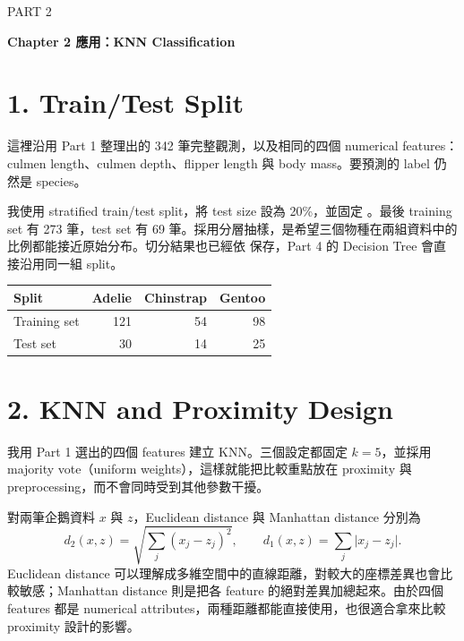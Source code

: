 \clearpage

\begin{center}
  {\color{accent}\large PART 2}\par
  \vspace{0.25em}
  {\Large\bfseries Chapter 2 應用：KNN Classification}\par
\end{center}

\vspace{1.0em}

\section*{1. Train/Test Split}
\sectionrule

這裡沿用 Part 1 整理出的 342 筆完整觀測，以及相同的四個 numerical features：culmen length、culmen depth、flipper length 與 body mass。要預測的 label 仍然是 species。

我使用 stratified train/test split，將 test size 設為 20\%，並固定 。最後 training set 有 273 筆，test set 有 69 筆。採用分層抽樣，是希望三個物種在兩組資料中的比例都能接近原始分布。切分結果也已經依  保存，Part 4 的 Decision Tree 會直接沿用同一組 split。

\begin{table}[H]
\centering
\small
\begin{tabular}{lrrr}
\toprule
\textbf{Split} & \textbf{Adelie} & \textbf{Chinstrap} & \textbf{Gentoo} \\
\midrule
Training set & 121 & 54 & 98 \\
Test set & 30 & 14 & 25 \\
\bottomrule
\end{tabular}
\end{table}

\section*{2. KNN and Proximity Design}
\sectionrule

我用 Part 1 選出的四個 features 建立 KNN。三個設定都固定 $k=5$，並採用 majority vote（uniform weights），這樣就能把比較重點放在 proximity 與 preprocessing，而不會同時受到其他參數干擾。

對兩筆企鵝資料 $x$ 與 $z$，Euclidean distance 與 Manhattan distance 分別為
\[
d_2(x,z)=\sqrt{\sum_j(x_j-z_j)^2},
\qquad
d_1(x,z)=\sum_j\lvert x_j-z_j\rvert.
\]
Euclidean distance 可以理解成多維空間中的直線距離，對較大的座標差異也會比較敏感；Manhattan distance 則是把各 feature 的絕對差異加總起來。由於四個 features 都是 numerical attributes，兩種距離都能直接使用，也很適合拿來比較 proximity 設計的影響。

